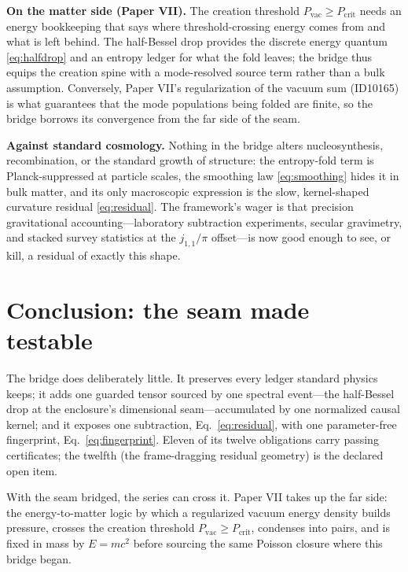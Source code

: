 \documentclass[11pt]{article}
\theoremstyle{remark}
\begin{document}
\textbf{On the matter side (Paper VII).} The creation threshold $P_{\mathrm{vac}} \geq P_{\mathrm{crit}}$ needs an energy bookkeeping that says where threshold-crossing energy comes from and what is left behind. The half-Bessel drop provides the discrete energy quantum \eqref{eq:halfdrop} and an entropy ledger for what the fold leaves; the bridge thus equips the creation spine with a mode-resolved source term rather than a bulk assumption. Conversely, Paper VII's regularization of the vacuum sum (ID10165) is what guarantees that the mode populations being folded are finite, so the bridge borrows its convergence from the far side of the seam.

\textbf{Against standard cosmology.} Nothing in the bridge alters nucleosynthesis, recombination, or the standard growth of structure: the entropy-fold term is Planck-suppressed at particle scales, the smoothing law \eqref{eq:smoothing} hides it in bulk matter, and its only macroscopic expression is the slow, kernel-shaped curvature residual \eqref{eq:residual}. The framework's wager is that precision gravitational accounting---laboratory subtraction experiments, secular gravimetry, and stacked survey statistics at the $j_{1,1}/\pi$ offset---is now good enough to see, or kill, a residual of exactly this shape.

\section{Conclusion: the seam made testable}
\label{sec:conclusion}

The bridge does deliberately little. It preserves every ledger standard physics keeps; it adds one guarded tensor sourced by one spectral event---the half-Bessel drop at the enclosure's dimensional seam---accumulated by one normalized causal kernel; and it exposes one subtraction, Eq.~\eqref{eq:residual}, with one parameter-free fingerprint, Eq.~\eqref{eq:fingerprint}. Eleven of its twelve obligations carry passing certificates; the twelfth (the frame-dragging residual geometry) is the declared open item.

With the seam bridged, the series can cross it. Paper VII takes up the far side: the energy-to-matter logic by which a regularized vacuum energy density builds pressure, crosses the creation threshold $P_{\mathrm{vac}} \geq P_{\mathrm{crit}}$, condenses into pairs, and is fixed in mass by $E = mc^2$ before sourcing the same Poisson closure where this bridge began.
\end{document}
